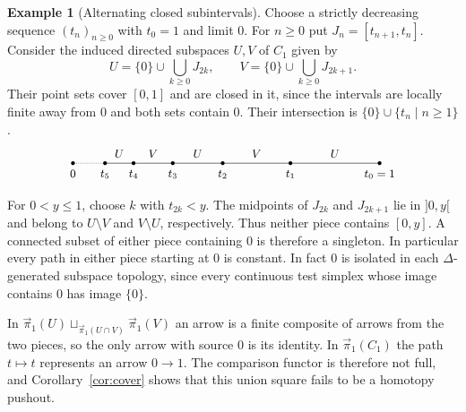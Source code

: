 \documentclass[12pt,a4paper]{amsart}
\theoremstyle{definition}
\newtheorem{example}[theorem]{Example}
\renewcommand{\leq}{\leqslant}
\renewcommand{\geq}{\geqslant}
\renewcommand{\vec}{\overrightarrow}
\newcommand{\cube}[1]{C_{#1}}
\newcommand{\PiC}{\vec{\pi}_1}
\begin{document}
\begin{example}[Alternating closed subintervals]\label{ex:alternating-cover}
Choose a strictly decreasing sequence $(t_n)_{n\geq0}$ with $t_0=1$ and limit $0$. For $n\geq0$ put $J_n=[t_{n+1},t_n]$. Consider the induced directed subspaces $U,V$ of $\cube1$ given by
\[
 U=\{0\}\cup\bigcup_{k\geq0}J_{2k},\qquad
 V=\{0\}\cup\bigcup_{k\geq0}J_{2k+1}.
\]
Their point sets cover $[0,1]$ and are closed in it, since the intervals are locally finite away from $0$ and both sets contain $0$. Their intersection is $\{0\}\cup\{t_n\mid n\geq1\}$.
\[
\begin{tikzpicture}[x=1cm,y=1cm,font=\small]
 \draw[densely dotted] (0,0)--(.9,0);
 \draw (.9,0)--(8.6,0);
 \foreach \x/\p in {0/0,.9/{t_5},1.7/{t_4},2.8/{t_3},4.2/{t_2},6.1/{t_1},8.6/{t_0=1}}{
   \fill (\x,0) circle (1.5pt) node[below=2pt] {$\p$};
 }
 \foreach \x/\part in {1.3/U,2.25/V,3.5/U,5.15/V,7.35/U}{
   \node[above=1pt] at (\x,0) {$\part$};
 }
\end{tikzpicture}
\]
For $0<y\leq1$, choose $k$ with $t_{2k}<y$. The midpoints of $J_{2k}$ and $J_{2k+1}$ lie in $]0,y[$ and belong to $U\setminus V$ and $V\setminus U$, respectively. Thus neither piece contains $[0,y]$. A connected subset of either piece containing $0$ is therefore a singleton. In particular every path in either piece starting at $0$ is constant. In fact $0$ is isolated in each $\Delta$-generated subspace topology, since every continuous test simplex whose image contains $0$ has image $\{0\}$.

In $\PiC(U)\sqcup_{\PiC(U\cap V)}\PiC(V)$ an arrow is a finite composite of arrows from the two pieces, so the only arrow with source $0$ is its identity. In $\PiC(\cube1)$ the path $t\mapsto t$ represents an arrow $0\to1$. The comparison functor is therefore not full, and Corollary~\ref{cor:cover} shows that this union square fails to be a homotopy pushout.
\end{example}
\end{document}
